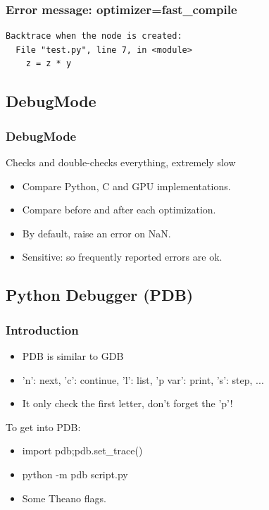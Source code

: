 \documentclass[utf8x,xcolor=pdftex,dvipsnames,table]{beamer}
\begin{document}
\begin{frame}[fragile]
  \frametitle{Error message: optimizer=fast\_compile}

\begin{lstlisting}
Backtrace when the node is created:
  File "test.py", line 7, in <module>
    z = z * y

\end{lstlisting}
\end{frame}

\subsection{DebugMode}
\begin{frame}[fragile]
  \frametitle{DebugMode}
    Checks and double-checks everything, extremely slow
\begin{itemize}
\item Compare Python, C and GPU implementations.
\item Compare before and after each optimization.
\item By default, raise an error on NaN.
\item Sensitive: so frequently reported errors are ok.
\end{itemize}
\end{frame}

\subsection{Python Debugger (PDB)}
\begin{frame}
  \frametitle{Introduction}
  \begin{itemize}
  \item PDB is similar to GDB
  \item 'n': next, 'c': continue, 'l': list, 'p var': print, 's': step, ...
  \item It only check the first letter, don't forget the 'p'!
  \end{itemize}
  To get into PDB:
  \begin{itemize}
  \item import pdb;pdb.set\_trace()
  \item python -m pdb script.py
  \item Some Theano flags.
  \end{itemize}
\end{frame}
\end{document}
